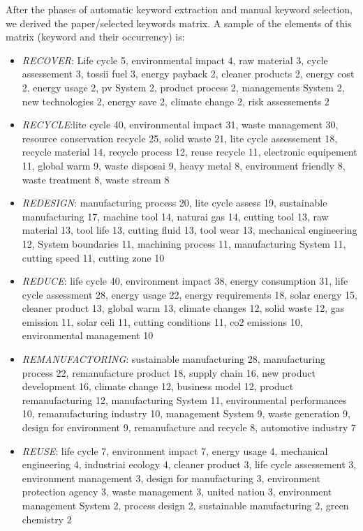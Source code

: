 \documentclass[]{book}
\providecommand{\tightlist}{%
  \setlength{\itemsep}{0pt}\setlength{\parskip}{0pt}}
\begin{document}
After the phases of automatic keyword extraction and manual keyword
selection, we derived the paper/selected keywords matrix. A sample of
the elements of this matrix (keyword and their occurrency) is:

\begin{itemize}
\tightlist
\item
  \emph{RECOVER}: Life cycle 5, environmental impact 4, raw material 3,
  cycle assessement 3, tossii fuel 3, energy payback 2, cleaner products
  2, energy cost 2, energy usage 2, pv System 2, product process 2,
  managements System 2, new technologies 2, energy save 2, climate
  change 2, risk assessements 2
\item
  \emph{RECYCLE}:lite cycle 40, environmental impact 31, waste
  management 30, resource conservation recycle 25, solid waste 21, lite
  cycle assessement 18, recycle material 14, recycle process 12, reuse
  recycle 11, electronic equipement 11, global warm 9, waste disposai 9,
  heavy metal 8, environment friendly 8, waste treatment 8, waste stream
  8
\item
  \emph{REDESIGN}: manufacturing process 20, lite cycle assess 19,
  sustainable manufacturing 17, machine tool 14, naturai gas 14, cutting
  tool 13, raw material 13, tool life 13, cutting fluid 13, tool wear
  13, mechanical engineering 12, System boundaries 11, machining process
  11, manufacturing System 11, cutting speed 11, cutting zone 10
\item
  \emph{REDUCE}: life cycle 40, environment impact 38, energy
  consumption 31, life cycle assessment 28, energy usage 22, energy
  requirements 18, solar energy 15, cleaner product 13, global warm 13,
  climate changes 12, solid waste 12, gas emission 11, solar celi 11,
  cutting conditions 11, co2 emissions 10, environmental management 10
\item
  \emph{REMANUFACTORING}: sustainable manufacturing 28, manufacturing
  process 22, remanufacture product 18, supply chain 16, new product
  development 16, climate change 12, business model 12, product
  remanufacturing 12, manufacturing System 11, environmental
  performances 10, remanufacturing industry 10, management System 9,
  waste generation 9, design for environment 9, remanufacture and
  recycle 8, automotive industry 7
\item
  \emph{REUSE}: life cycle 7, environment impact 7, energy usage 4,
  mechanical engineering 4, industriai ecology 4, cleaner product 3,
  life cycle assessement 3, environment management 3, design for
  manufacturing 3, environment protection agency 3, waste management 3,
  united nation 3, environment management System 2, process design 2,
  sustainable manufacturing 2, green chemistry 2
\end{itemize}
\end{document}
